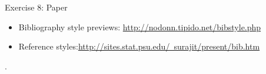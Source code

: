 \documentclass[10pt,times]{beamer}
\begin{document}
\begin{frame}[fragile]{Exercise 8: Paper}

\begin{center}
\end{center}

\begin{center}
\end{center}

\begin{center}
\end{center}

\begin{itemize}

\item Bibliography style previews: 
\href{http://nodonn.tipido.net/bibstyle.php}{http://nodonn.tipido.net/bibstyle.php}
\item Reference 
styles:\href{http://sites.stat.psu.edu/~surajit/present/bib.htm}{http://sites.stat.psu.edu/~surajit/present/bib.htm}
\end{itemize}

\begin{center}
%
.
\end{center}

\end{frame}
\end{document}
